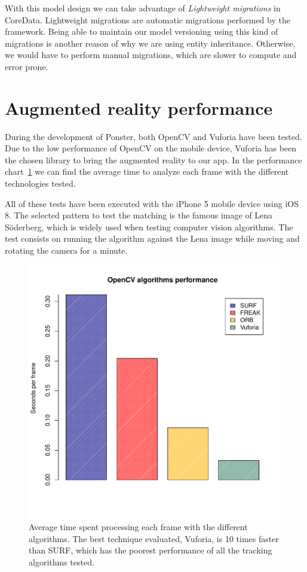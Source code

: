 With this model design we can take advantage of \emph{Lightweight migrations}
in CoreData. Lightweight migrations are automatic migrations performed
 by the framework. Being able to maintain our model versioning 
using this kind of migrations is another reason of why we are using entity
inheritance. Otherwise, we would have to perform manual migrations, which are
slower to compute and error prone.

\section{Augmented reality performance}
\label{sec:arperf}
During the development of Ponster, both OpenCV and Vuforia have been tested. Due to
the low performance of OpenCV on the mobile device, Vuforia has been the chosen library
to bring the augmented reality to our app. In the performance
chart~\ref{fig:performance} we can find the average time to analyze each frame with
the different technologies tested. 

All of these tests have been executed with the iPhone 5 mobile device using iOS
8. The selected pattern to test the matching is the famous image of Lena Söderberg,
which is widely used when testing computer vision algorithms. The test consists on
running the algorithm against the Lena image while moving and rotating the camera
for a minute.

\begin{figure}
\centering
\includegraphics[scale=0.75]{performance/plot.pdf}
\caption{\label{fig:performance} Average time spent processing each frame with the
  different algorithms. The best technique evaluated, Vuforia, is 10 times faster
  than SURF, which has the poorest performance of all the tracking algorithms
  tested.} 
\end{figure} 

